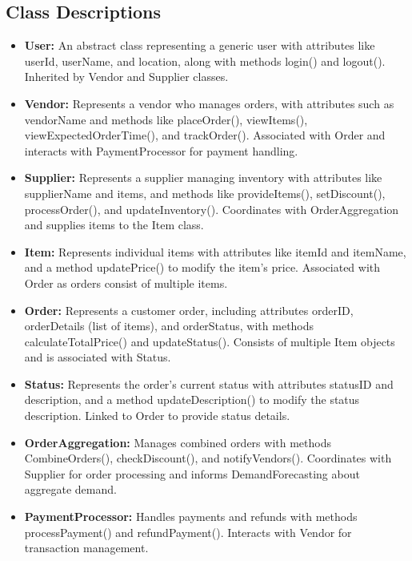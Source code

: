 \subsection{Class Descriptions}

\begin{itemize}
    \item \textbf{User:} An abstract class representing a generic user with attributes like userId, userName, and location, along with methods login() and logout(). Inherited by Vendor and Supplier classes.

    \item \textbf{Vendor:} Represents a vendor who manages orders, with attributes such as vendorName and methods like placeOrder(), viewItems(), viewExpectedOrderTime(), and trackOrder(). Associated with Order and interacts with PaymentProcessor for payment handling.

    \item \textbf{Supplier:} Represents a supplier managing inventory with attributes like supplierName and items, and methods like provideItems(), setDiscount(), processOrder(), and updateInventory(). Coordinates with OrderAggregation and supplies items to the Item class.

    \item \textbf{Item:} Represents individual items with attributes like itemId and itemName, and a method updatePrice() to modify the item's price. Associated with Order as orders consist of multiple items.

    \item \textbf{Order:} Represents a customer order, including attributes orderID, orderDetails (list of items), and orderStatus, with methods calculateTotalPrice() and updateStatus(). Consists of multiple Item objects and is associated with Status.

    \item \textbf{Status:} Represents the order's current status with attributes statusID and description, and a method updateDescription() to modify the status description. Linked to Order to provide status details.

    \item \textbf{OrderAggregation:} Manages combined orders with methods CombineOrders(), checkDiscount(), and notifyVendors(). Coordinates with Supplier for order processing and informs DemandForecasting about aggregate demand.

    \item \textbf{PaymentProcessor:} Handles payments and refunds with methods processPayment() and refundPayment(). Interacts with Vendor for transaction management.


\end{itemize}
